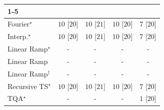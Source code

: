 \begin{tabular}{l|cccc|}
\cline{1-5}
\multicolumn{5}{c}{\rule{0pt}{8pt}SV} \\
\midrule
Fourier$^\star$ & {\cellcolor[HTML]{00441B}} \color[HTML]{F1F1F1} $10$ [$20$] & {\cellcolor[HTML]{00441B}} \color[HTML]{F1F1F1} $10$ [$21$] & {\cellcolor[HTML]{00441B}} \color[HTML]{F1F1F1} $10$ [$20$] & {\cellcolor[HTML]{37A055}} \color[HTML]{F1F1F1} $7$ [$20$] \\
Interp.$^\star$ & {\cellcolor[HTML]{00441B}} \color[HTML]{F1F1F1} $10$ [$20$] & {\cellcolor[HTML]{00441B}} \color[HTML]{F1F1F1} $10$ [$21$] & {\cellcolor[HTML]{00441B}} \color[HTML]{F1F1F1} $10$ [$20$] & {\cellcolor[HTML]{37A055}} \color[HTML]{F1F1F1} $7$ [$20$] \\
Linear Ramp$^\star$ & {\cellcolor[HTML]{000000}} \color[HTML]{F1F1F1} {\cellcolor{white}} \color{black} - & {\cellcolor[HTML]{000000}} \color[HTML]{F1F1F1} {\cellcolor{white}} \color{black} - & {\cellcolor[HTML]{000000}} \color[HTML]{F1F1F1} {\cellcolor{white}} \color{black} - & {\cellcolor[HTML]{000000}} \color[HTML]{F1F1F1} {\cellcolor{white}} \color{black} - \\
Linear Ramp & {\cellcolor[HTML]{000000}} \color[HTML]{F1F1F1} {\cellcolor{white}} \color{black} - & {\cellcolor[HTML]{000000}} \color[HTML]{F1F1F1} {\cellcolor{white}} \color{black} - & {\cellcolor[HTML]{000000}} \color[HTML]{F1F1F1} {\cellcolor{white}} \color{black} - & {\cellcolor[HTML]{000000}} \color[HTML]{F1F1F1} {\cellcolor{white}} \color{black} - \\
Linear Ramp$^\dagger$ & {\cellcolor[HTML]{000000}} \color[HTML]{F1F1F1} {\cellcolor{white}} \color{black} - & {\cellcolor[HTML]{000000}} \color[HTML]{F1F1F1} {\cellcolor{white}} \color{black} - & {\cellcolor[HTML]{000000}} \color[HTML]{F1F1F1} {\cellcolor{white}} \color{black} - & {\cellcolor[HTML]{000000}} \color[HTML]{F1F1F1} {\cellcolor{white}} \color{black} - \\
Recursive TS$^\star$ & {\cellcolor[HTML]{00441B}} \color[HTML]{F1F1F1} $10$ [$20$] & {\cellcolor[HTML]{00441B}} \color[HTML]{F1F1F1} $10$ [$21$] & {\cellcolor[HTML]{00441B}} \color[HTML]{F1F1F1} $10$ [$20$] & {\cellcolor[HTML]{37A055}} \color[HTML]{F1F1F1} $7$ [$20$] \\
TQA$^\star$ & {\cellcolor[HTML]{000000}} \color[HTML]{F1F1F1} {\cellcolor{white}} \color{black} - & {\cellcolor[HTML]{000000}} \color[HTML]{F1F1F1} {\cellcolor{white}} \color{black} - & {\cellcolor[HTML]{000000}} \color[HTML]{F1F1F1} {\cellcolor{white}} \color{black} - & {\cellcolor[HTML]{F7FCF5}} \color[HTML]{000000} $1$ [$20$] \\

\end{tabular}

